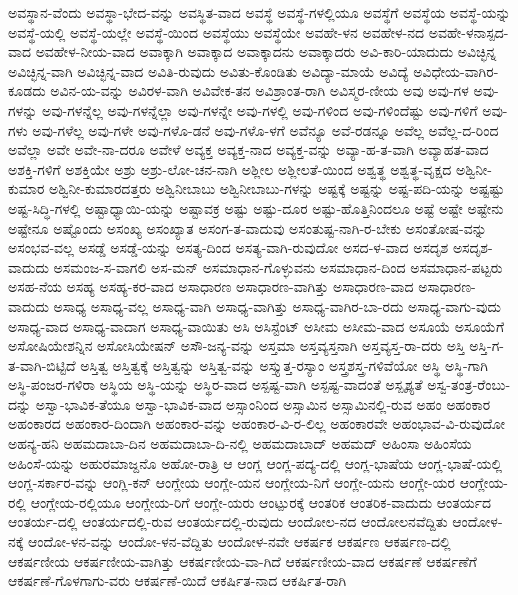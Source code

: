 {ಅವಸ್ಥಾನ-ವೆಂದು
ಅವಸ್ಥಾ-ಭೇದ-ವನ್ನು
ಅವಸ್ಥಿತ-ವಾದ
ಅವಸ್ಥೆ
ಅವಸ್ಥೆ-ಗಳಲ್ಲಿಯೂ
ಅವಸ್ಥೆಗೆ
ಅವಸ್ಥೆಯ
ಅವಸ್ಥೆ-ಯನ್ನು
ಅವಸ್ಥೆ-ಯಲ್ಲಿ
ಅವಸ್ಥೆ-ಯಲ್ಲೇ
ಅವಸ್ಥೆ-ಯಿಂದ
ಅವಸ್ಥೆಯು
ಅವಸ್ಥೆಯೇ
ಅವಹೇ-ಳನ
ಅವಹೇಳ-ನದ
ಅವಹೇ-ಳನಾಸ್ಪದ-ವಾದ
ಅವಹೇಳ-ನೀಯ-ವಾದ
ಅವಾಕ್ಕಾಗಿ
ಅವಾಕ್ಕಾದ
ಅವಾಕ್ಕಾದನು
ಅವಾಕ್ಕಾದರು
ಅವಿ-ಕಾರಿ-ಯಾದುದು
ಅವಿಚ್ಛಿನ್ನ
ಅವಿಚ್ಛಿನ್ನ-ವಾಗಿ
ಅವಿಚ್ಛಿನ್ನ-ವಾದ
ಅವಿತಿ-ರುವುದು
ಅವಿತು-ಕೊಂಡಿತು
ಅವಿದ್ಯಾ-ಮಾಯೆ
ಅವಿದ್ಯೆ
ಅವಿಧೇಯ-ವಾಗಿರ-ಕೂಡದು
ಅವಿನ-ಯ-ವನ್ನು
ಅವಿರಳ-ವಾಗಿ
ಅವಿವೇಕ-ತನ
ಅವಿಶ್ರಾಂತ-ರಾಗಿ
ಅವಿಸ್ಮರ-ಣೀಯ
ಅವು
ಅವು-ಗಳ
ಅವು-ಗಳನ್ನು
ಅವು-ಗಳನ್ನೆಲ್ಲ
ಅವು-ಗಳನ್ನೆಲ್ಲಾ
ಅವು-ಗಳನ್ನೇ
ಅವು-ಗಳಲ್ಲಿ
ಅವು-ಗಳಿಂದ
ಅವು-ಗಳಿಂದೆಷ್ಟು
ಅವು-ಗಳಿಗೆ
ಅವು-ಗಳು
ಅವು-ಗಳೆಲ್ಲ
ಅವು-ಗಳೇ
ಅವು-ಗಳೊ-ಡನೆ
ಅವು-ಗಳೊ-ಳಗೆ
ಅವೆನ್ಯೂ
ಅವೆ-ರಡನ್ನೂ
ಅವೆಲ್ಲ
ಅವೆಲ್ಲ-ದ-ರಿಂದ
ಅವೆಲ್ಲಾ
ಅವೇ
ಅವೇ-ನಾ-ದರೂ
ಅವೇಳೆ
ಅವ್ಯಕ್ತ
ಅವ್ಯಕ್ತ-ನಾದ
ಅವ್ಯಕ್ತ-ವನ್ನು
ಅವ್ಯಾ-ಹ-ತ-ವಾಗಿ
ಅವ್ಯಾಹತ-ವಾದ
ಅಶಕ್ತಿ-ಗಳಿಗೆ
ಅಶಕ್ತಿಯೇ
ಅಶ್ರು
ಅಶ್ರು-ಲೋ-ಚನ-ನಾಗಿ
ಅಶ್ಲೀಲ
ಅಶ್ಲೀಲತೆ-ಯಿಂದ
ಅಶ್ವತ್ಥ
ಅಶ್ವತ್ಥ-ವೃಕ್ಷದ
ಅಶ್ವಿನೀ-ಕುಮಾರ
ಅಶ್ವಿನೀ-ಕುಮಾರದತ್ತರು
ಅಶ್ವಿನೀಬಾಬು
ಅಶ್ವಿನೀಬಾಬು-ಗಳನ್ನು
ಅಷ್ಟಕ್ಕೆ
ಅಷ್ಟನ್ನು
ಅಷ್ಟ-ಪದಿ-ಯನ್ನು
ಅಷ್ಟಷ್ಟು
ಅಷ್ಟ-ಸಿದ್ಧಿ-ಗಳಲ್ಲಿ
ಅಷ್ಟಾಧ್ಯಾಯಿ-ಯನ್ನು
ಅಷ್ಟಾವಕ್ರ
ಅಷ್ಟು
ಅಷ್ಟು-ದೂರ
ಅಷ್ಟು-ಹೊತ್ತಿನಿಂದಲೂ
ಅಷ್ಟೆ
ಅಷ್ಟೇ
ಅಷ್ಟೇನು
ಅಷ್ಟೇನೂ
ಅಷ್ಟೊಂದು
ಅಸಂಖ್ಯ
ಅಸಂಖ್ಯಾತ
ಅಸಂಗ-ತ-ವಾದುವು
ಅಸಂತುಷ್ಟ-ನಾಗಿ-ರ-ಬೇಕು
ಅಸಂತೋಷ-ವನ್ನು
ಅಸಂಭವ-ವಲ್ಲ
ಅಸಡ್ಡೆ
ಅಸಡ್ಡೆ-ಯನ್ನು
ಅಸತ್ಯ-ದಿಂದ
ಅಸತ್ಯ-ವಾಗಿ-ರುವುದೋ
ಅಸದ-ಳ-ವಾದ
ಅಸದೃಶ
ಅಸದೃಶ-ವಾದುದು
ಅಸಮಂಜ-ಸ-ವಾಗಲಿ
ಅಸ-ಮನ್
ಅಸಮಾಧಾನ-ಗೊಳ್ಳುವನು
ಅಸಮಾಧಾನ-ದಿಂದ
ಅಸಮಾಧಾನ-ಪಟ್ಟರು
ಅಸಹ-ನೆಯ
ಅಸಹ್ಯ
ಅಸಹ್ಯ-ಕರ-ವಾದ
ಅಸಾಧಾರಣ
ಅಸಾಧಾರಣ-ವಾಗಿತ್ತು
ಅಸಾಧಾರಣ-ವಾದ
ಅಸಾಧಾರಣ-ವಾದುದು
ಅಸಾಧ್ಯ
ಅಸಾಧ್ಯ-ವಲ್ಲ
ಅಸಾಧ್ಯ-ವಾಗಿ
ಅಸಾಧ್ಯ-ವಾಗಿತ್ತು
ಅಸಾಧ್ಯ-ವಾಗಿರ-ಬಾ-ರದು
ಅಸಾಧ್ಯ-ವಾಗು-ವುದು
ಅಸಾಧ್ಯ-ವಾದ
ಅಸಾಧ್ಯ-ವಾದಾಗ
ಅಸಾಧ್ಯ-ವಾಯಿತು
ಅಸಿ
ಅಸಿಸ್ಟೆಂಟ್
ಅಸೀಮ
ಅಸೀಮ-ವಾದ
ಅಸೂಯೆ
ಅಸೂಯೆಗೆ
ಅಸೋಷಿಯೇಶನ್ನಿನ
ಅಸೋಸಿಯೇಷನ್
ಅಸೌ-ಜನ್ಯ-ವನ್ನು
ಅಸ್ತಮಾ
ಅಸ್ತವ್ಯಸ್ತನಾಗಿ
ಅಸ್ತವ್ಯಸ್ತ-ರಾ-ದರು
ಅಸ್ತಿ
ಅಸ್ತಿ-ಗ-ತ-ವಾಗಿ-ಬಿಟ್ಟಿದೆ
ಅಸ್ತಿತ್ವ
ಅಸ್ತಿತ್ವಕ್ಕೆ
ಅಸ್ತಿತ್ವನ್ನು
ಅಸ್ತಿತ್ವ-ವನ್ನು
ಅಸ್ತ್ಯುತ್ತ-ರಸ್ಯಾಂ
ಅಸ್ತ್ರಶಸ್ತ್ರ-ಗಳಿವೆಯೋ
ಅಸ್ಥಿ
ಅಸ್ಥಿ-ಗಾಗಿ
ಅಸ್ಥಿ-ಪಂಜರ-ಗಳಿರಾ
ಅಸ್ಥಿಯ
ಅಸ್ಥಿ-ಯನ್ನು
ಅಸ್ಥಿರ-ವಾದ
ಅಸ್ಪಷ್ಟ-ವಾಗಿ
ಅಸ್ಪಷ್ಟ-ವಾದಂತೆ
ಅಸ್ಪೃಶ್ಯತೆ
ಅಸ್ವ-ತಂತ್ರ-ರೆಂಬು-ದನ್ನು
ಅಸ್ವಾ-ಭಾವಿಕ-ತೆಯೂ
ಅಸ್ವಾ-ಭಾವಿಕ-ವಾದ
ಅಸ್ಸಾಂನಿಂದ
ಅಸ್ಸಾಮಿನ
ಅಸ್ಸಾಮಿನಲ್ಲಿ-ರುವ
ಅಹಂ
ಅಹಂಕಾರ
ಅಹಂಕಾರದ
ಅಹಂಕಾರ-ದಿಂದಾಗಿ
ಅಹಂಕಾರ-ವನ್ನು
ಅಹಂಕಾರ-ವಿ-ರ-ಲಿಲ್ಲ
ಅಹಂಕಾರವೇ
ಅಹಂಭಾವ-ವಿ-ರುವುದೋ
ಅಹನ್ಯ-ಹನಿ
ಅಹಮದಾಬಾ-ದಿನ
ಅಹಮದಾಬಾ-ದಿ-ನಲ್ಲಿ
ಅಹಮದಾಬಾದ್
ಅಹಮದ್
ಅಹಿಂಸಾ
ಅಹಿಂಸೆಯ
ಅಹಿಂಸೆ-ಯನ್ನು
ಅಹುರಮಾಜ್ದನೊ
ಅಹೋ-ರಾತ್ರಿ
ಆ
ಆಂಗ್ಲ
ಆಂಗ್ಲ-ಪದ್ಯ-ದಲ್ಲಿ
ಆಂಗ್ಲ-ಭಾಷೆಯ
ಆಂಗ್ಲ-ಭಾಷೆ-ಯಲ್ಲಿ
ಆಂಗ್ಲ-ಸರ್ಕಾರ-ವನ್ನು
ಆಂಗ್ಲಿ-ಕನ್
ಆಂಗ್ಲೇಯ
ಆಂಗ್ಲೇ-ಯನ
ಆಂಗ್ಲೇಯ-ನಿಗೆ
ಆಂಗ್ಲೇ-ಯನು
ಆಂಗ್ಲೇ-ಯರ
ಆಂಗ್ಲೇಯ-ರಲ್ಲಿ
ಆಂಗ್ಲೇಯ-ರಲ್ಲಿಯೂ
ಆಂಗ್ಲೇಯ-ರಿಗೆ
ಆಂಗ್ಲೇ-ಯರು
ಆಂಟ್ಪುರಕ್ಕೆ
ಆಂತರಿಕ
ಆಂತರಿಕ-ವಾದುದು
ಆಂತರ್ಯದ
ಆಂತರ್ಯ-ದಲ್ಲಿ
ಆಂತರ್ಯದಲ್ಲಿ-ರುವ
ಆಂತರ್ಯದಲ್ಲಿ-ರುವುದು
ಆಂದೋಲ-ನದ
ಆಂದೋಲನವೆದ್ದಿತು
ಆಂದೋಳ-ನಕ್ಕೆ
ಆಂದೋ-ಳನ-ವನ್ನು
ಆಂದೋ-ಳನ-ವೆದ್ದಿತು
ಆಂದೋಳ-ನವೇ
ಆಕರ್ಷಕ
ಆಕರ್ಷಣ
ಆಕರ್ಷಣ-ದಲ್ಲಿ
ಆಕರ್ಷಣೀಯ
ಆಕರ್ಷಣೀಯ-ವಾಗಿತ್ತು
ಆಕರ್ಷಣೀಯ-ವಾ-ಗಿದೆ
ಆಕರ್ಷಣೀಯ-ವಾದ
ಆಕರ್ಷಣೆ
ಆಕರ್ಷಣೆಗೆ
ಆಕರ್ಷಣೆ-ಗೊಳಗಾಗು-ವರು
ಆಕರ್ಷಣೆ-ಯಿದೆ
ಆಕರ್ಷಿತ-ನಾದ
ಆಕರ್ಷಿತ-ರಾಗಿ
}
